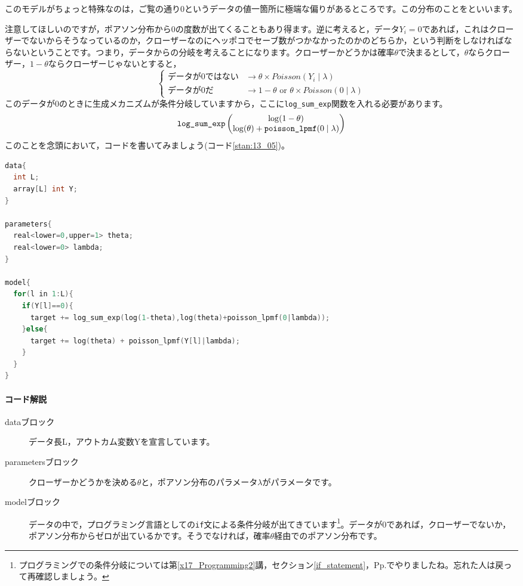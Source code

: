 \documentclass{ltjsbook}
\begin{document}
このモデルがちょっと特殊なのは，ご覧の通り0というデータの値一箇所に極端な偏りがあるところです。この分布のことをといいます。

注意してほしいのですが，ポアソン分布から0の度数が出てくることもあり得ます。逆に考えると，データ$Y_i=0$であれば，これはクローザーでないからそうなっているのか，クローザーなのにヘッポコでセーブ数がつかなかったのかのどちらか，という判断をしなければならないということです。つまり，データからの分岐を考えることになります。クローザーかどうかは確率$\theta$で決まるとして，$\theta$ならクローザー，$1-\theta$ならクローザーじゃないとすると，
\begin{equation}
	\left\{ \begin{array}{cc} \mbox{データが0ではない} & \to \theta \times Poisson(Y_i\mid\lambda)                    \\
             \mbox{データが0だ}         & \to 1-\theta \mbox{ or } \theta \times Poisson(0\mid\lambda)\end{array} \right.
\end{equation}
このデータが0のときに生成メカニズムが条件分岐していますから，ここに\verb|log_sum_exp|関数を入れる必要があります。
\begin{equation*}
	\verb|log_sum_exp| \begin{pmatrix} \log(1-\theta) \\ \log(\theta) + \verb|poisson_lpmf|(0\mid\lambda)\end{pmatrix}
\end{equation*}
このことを念頭において，コードを書いてみましょう(コード\ref{stan:13_05})。
\begin{lstlisting}[language=C++,label={stan:13_05},caption={ゼロ過剰ポアソン分布}]
data{
  int L;
  array[L] int Y;
}

parameters{
  real<lower=0,upper=1> theta;
  real<lower=0> lambda;
}

model{
  for(l in 1:L){
    if(Y[l]==0){
      target += log_sum_exp(log(1-theta),log(theta)+poisson_lpmf(0|lambda));
    }else{
      target += log(theta) + poisson_lpmf(Y[l]|lambda);
    }
  }
}
\end{lstlisting}
\paragraph{コード解説}
\begin{description}
	\item[dataブロック] データ長L，アウトカム変数Yを宣言しています。
	\item[parametersブロック] クローザーかどうかを決める$\theta$と，ポアソン分布のパラメータ$\lambda$がパラメータです。
	\item[modelブロック] データの中で，プログラミング言語としての\verb|if|文による条件分岐が出てきています\footnote{プログラミングでの条件分岐については第\ref{x17_Programming2}講，セクション\ref{if_statement}，Pp.\pageref{if_statement}でやりましたね。忘れた人は戻って再確認しましょう。}。データが0であれば，クローザーでないか，ポアソン分布からゼロが出ているかです。そうでなければ，確率$\theta$経由でのポアソン分布です。
\end{description}
\end{document}
